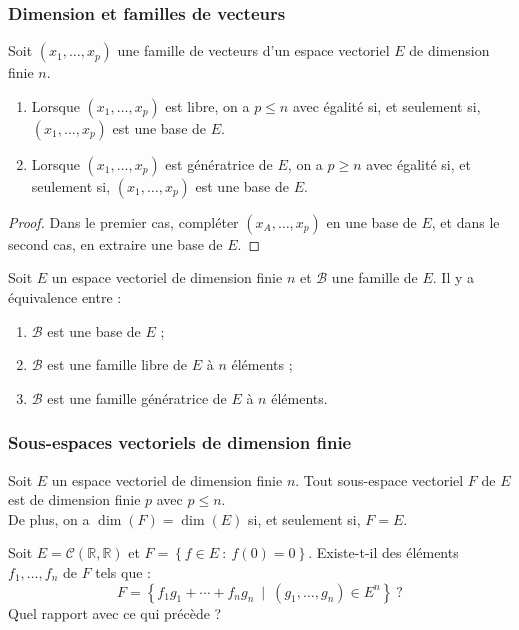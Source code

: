 \documentclass[french]{article}
\newcommand{\R}{\mathbb{R}}
\theoremstyle{plain}
\theoremstyle{definition}
\theoremstyle{remark}
\begin{document}
\subsubsection*{Dimension et familles de vecteurs}

\begin{prop}%
	Soit $(x_1,\ldots,x_p)$ une famille de vecteurs d'un espace vectoriel $E$ de dimension finie $n$.
	\begin{enumerate}
		\item Lorsque $(x_1,\ldots,x_p)$ est libre, on a $p\leqslant n$ avec égalité si, et seulement si, $(x_1,\ldots,x_p)$ est une base de $E$.
		\item Lorsque $(x_1,\ldots,x_p)$ est génératrice de $E$, on a $p\geqslant n$ avec égalité si, et seulement si, $(x_1,\ldots,x_p)$ est une base de $E$.
	\end{enumerate}
\end{prop}
\begin{proof}
	Dans le premier cas, compléter $(x_A,\ldots,x_p)$ en une base de $E$, et dans le second cas, en extraire une base de $E$.
\end{proof}

\begin{cor}%
	Soit $E$ un espace vectoriel de dimension finie $n$ et $\mathcal{B}$ une famille de $E$. Il y a équivalence entre :
	\begin{enumerate}[label=(\roman*)]
		\item $\mathcal{B}$ est une base de $E$ ;
		\item $\mathcal{B}$ est une famille libre de $E$ à $n$ éléments ;
		\item $\mathcal{B}$ est une famille génératrice de $E$ à $n$ éléments.
	\end{enumerate}
\end{cor}

\subsubsection*{Sous-espaces vectoriels de dimension finie}

\begin{prop}%
	Soit $E$ un espace vectoriel de dimension finie $n$. Tout sous-espace vectoriel $F$ de $E$ est de dimension finie $p$ avec $p\leqslant n$. \\
	De plus, on a $\dim(F)=\dim(E)$ si, et seulement si, $F=E$.
\end{prop}

\begin{exo}[$\star$]
	Soit $E=\mathcal{C}(\R,\R)$ et $F=\left\{f\in E\ :\ f(0)=0\right\}$. Existe-t-il des éléments $f_1,\ldots,f_n$ de $F$ tels que : $$F=\left\{f_1g_1+\cdots+f_ng_n\ \mid\ (g_1,\ldots,g_n)\in E^n\right\}\ ?$$ Quel rapport avec ce qui précède ?
\end{exo}
\end{document}
